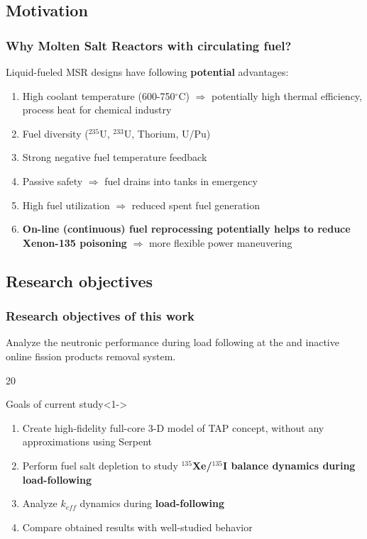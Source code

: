\subsection{Motivation}

\begin{frame}
\frametitle{Why Molten Salt Reactors with circulating fuel?}
\begin{block}{Liquid-fueled MSR designs have following \textbf{potential} 
advantages:}
	\begin{enumerate}
		\itemsep1em
		\item High coolant temperature (600-750$^{\circ}$C) 
		$\Rightarrow$ potentially high thermal efficiency, process 
		heat for chemical industry
		\item Fuel diversity ($^{235}$U, $^{233}$U, Thorium, U/Pu)
		\item Strong negative fuel temperature feedback 
		\item Passive safety $\Rightarrow$ fuel drains into tanks 
		in emergency
		\item High fuel utilization $\Rightarrow$ reduced spent fuel 
		generation
		\item<2> \textbf{On-line (continuous) fuel reprocessing potentially  
		helps to reduce Xenon-135 poisoning} $\Rightarrow$ more flexible  
		power maneuvering
	\end{enumerate}
\end{block}

\end{frame}


\subsection{Research objectives}

\begin{frame}
  \frametitle{Research objectives of this work}
     Analyze the   neutronic performance during 
     load following at the  and inactive online fission products 
     removal system.
  \begin{overlayarea}{\linewidth}{20\baselineskip}
     \begin{block}{Goals of current study}<1->
         \begin{enumerate}
         		\itemsep1em
                \item<1-> Create high-fidelity full-core 3-D model of 
                TAP concept, without any
approximations 
                using Serpent 
                \cite{leppanen_serpent_2014}
                \item<2-> Perform fuel salt depletion to study 
                \textbf{$^{135}$Xe/$^{135}$I balance dynamics during 
                load-following}
            	\item<3-> Analyze $k_{eff}$ dynamics during 
            	\textbf{load-following}
                \item<4-> Compare obtained results with well-studied 
                 behavior
         \end{enumerate}
      \end{block}
  \end{overlayarea}
\end{frame}
